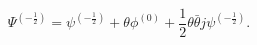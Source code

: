 \begin{equation}
 \Psi^{(-\frac{1}{2})}=\psi^{(-\frac{1}{2})}+\theta\phi^{(0)}+
\frac{1}{2}\theta\bar\theta j\psi^{(-\frac{1}{2})}.
\end{equation}

